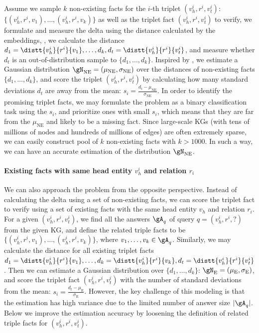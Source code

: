 Assume we sample $k$ non-existing facts for the $i$-th triplet $(v_h^i, r^i, v_t^i)$: $\{(v_h^i, r^i, v_1), \dots, (v_h^i, r^i, v_k)\}$ as well as the triplet fact $(v_h^i, r^i, v_t^i)$ to verify, we formulate and measure the delta using the distance calculated by the embeddings, \ie, we calculate the distance $d_1=\distt{v_h^i}{r^i}{v_1}, \dots, d_k, d_t=\distt{v_h^i}{r^i}{v_t^i}$, and measure whether $d_t$ is an out-of-distribution sample to $\{d_1, \dots, d_k\}$. Inspired by , we estimate a Gaussian distribution $\gN_\text{NE}=(\mu_\text{NE}, \sigma_\text{NE})$ over the distances of non-existing facts $\{d_1, \dots, d_k\}$, and score the triplet $(v_h^i, r^i, v_t^i)$ by calculating how many standard deviations $d_t$ are away from the mean: $s_i=\frac{d_t - \mu_\text{NE}}{\sigma_\text{NE}}$. In order to identify the promising triplet facts, we may formulate the problem as a binary classification task using the $s_i$, and prioritize ones with small $s_i$, which means that they are far from the $\mu_\text{NE}$ and likely to be a missing fact.
Since large-scale KGs (with tens of millions of nodes and hundreds of millions of edges) are often extremely sparse, we can easily construct pool of $k$ non-existing facts with $k>1000$. In such a way, we can have an accurate estimation of the distribution $\gN_\text{NE}$.

\paragraph{Existing facts with same head entity $v_h^i$ and relation $r_i$}
We can also approach the problem from the opposite perspective. Instead of calculating the delta using a set of non-existing facts, we can score the triplet fact to verify using a set of existing facts with the same head entity $v_h$ and relation $r_i$.  
For a given $(v_h^i, r^i, v_t^i)$, we find all the answers $\gA_q$ of query $q=(v_h^i, r^i, ?)$ from the given KG, and define the related triple facts to be $\{(v_h^i, r^i, v_1), \dots, (v_h^i, r^i, v_k)\}$, where $v_1, \dots, v_k\in\gA_q$. Similarly, we may calculate the distance for all existing triplet facts $d_1=\distt{v_h^i}{r^i}{v_1}, \dots, d_k=\distt{v_h^i}{r^i}{v_k}, d_t=\distt{v_h^i}{r^i}{v_t^i}$. Then we can estimate a Gaussian distribution over $\{d_1, \dots, d_k\}$: $\gN_\text{E}=(\mu_\text{E}, \sigma_\text{E})$, and score the triplet fact $(v_h^i, r^i, v_t^i)$ with the number of standard deviations from the mean: $s_i=\frac{d_t - \mu_\text{E}}{\sigma_\text{E}}$. 
However, the key challenge of this modeling is that the estimation has high variance due to the limited number of answer size $|\gA_q|$. Below we improve the estimation accuracy by loosening the definition of related triple facts for $(v_h^i, r^i, v_t^i)$.

